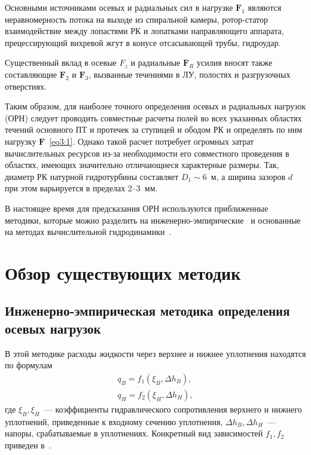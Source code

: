 Основными источниками осевых и радиальных сил в нагрузке $\textbf{F}_1$ являются
неравномерность потока на выходе из спиральной камеры, ротор-статор взаимодействие между лопастями
РК и лопатками направляющего аппарата, прецессирующий вихревой жгут в конусе отсасывающей трубы,
гидроудар.

Существенный вклад в осевые $F_z$ и радиальные $\textbf{F}_R$ усилия
вносят также составляющие $\textbf{F}_2$ и $\textbf{F}_3$, вызванные течениями в ЛУ, полостях и
разгрузочных отверстиях.

Таким образом, для наиболее точного определения осевых и радиальных нагрузок (ОРН) следует проводить
совместные расчеты полей во всех указанных областях течений основного ПТ и протечек за ступицей и ободом РК и
определять по ним нагрузку $\textbf{F}$~\eqref{eq3:1}. 
Однако такой расчет потребует огромных затрат вычислительных ресурсов из-за необходимости 
его совместного проведения в областях, имеющих значительно отличающиеся характерные размеры. 
Так, диаметр РК натурной гидротурбины составляет
$D_1\sim 6$~м, а ширина зазоров $d$ при этом варьируется в пределах 2--3~мм. 

В настоящее время для предсказания ОРН используются приближенные методики, которые можно разделить на
инженерно-эмпирические~\cite{lomakin, mak_pilev, kuzminsk} и основанные на методах вычислительной 
гидродинамики~\cite{staubli, roy_vu, xi_rhode}.

\section{Обзор существующих методик}
\label{s:32}
\subsection{Инженерно-эмпирическая методика определения осевых нагрузок}
\label{s:321}
В этой методике расходы жидкости через верхнее и нижнее уплотнения находятся по формулам
\begin{gather*}
 q_B  = f_1 (\xi_B ,\Delta h_B ), \\
 q_H  = f_2 (\xi_H ,\Delta h_H ),
\end{gather*}
где  $\xi_B,\xi_H$~--- коэффициенты гидравлического сопротивления верхнего и нижнего уплотнений, приведенные 
к  входному сечению уплотнения, $\Delta h_B, \Delta h_H$~--- напоры, срабатываемые в уплотнениях. 
Конкретный вид зависимостей $f_1, f_2$ приведен в~\cite{mak_pilev}.

